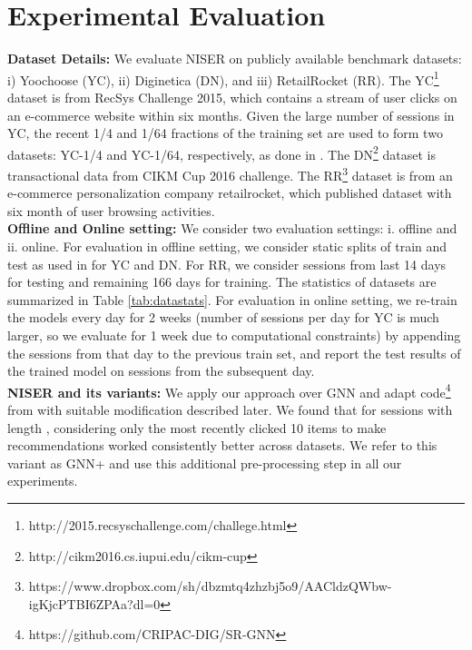 \documentclass[sigconf]{acmart}
\begin{document}
\section{Experimental Evaluation}
\textbf{Dataset Details:}
We evaluate NISER on publicly available benchmark datasets: i) Yoochoose (YC), ii) Diginetica (DN), and iii) RetailRocket (RR).
The YC\footnote{http://2015.recsyschallenge.com/challege.html} dataset is from RecSys Challenge 2015, which contains a stream of user clicks on an e-commerce website within six months. 
Given the large number of sessions in YC, the recent 1/4 and 1/64 fractions of the training set are used to form two datasets: YC-1/4 and YC-1/64, respectively, as done in \cite{wu2018session}.
The DN\footnote{http://cikm2016.cs.iupui.edu/cikm-cup} dataset is transactional data from CIKM Cup 2016 challenge. The RR\footnote{https://www.dropbox.com/sh/dbzmtq4zhzbj5o9/AACldzQWbw-igKjcPTBI6ZPAa?dl=0} dataset is from an e-commerce personalization company retailrocket, which published dataset with six month of user browsing activities.
\\
\textbf{Offline and Online setting:} 
We consider two evaluation settings: i. offline and ii. online.
For evaluation in offline setting, we consider static splits of train and test as used in \cite{wu2018session} for YC and DN.
For RR, we consider sessions from last 14 days for testing and remaining 166 days for training. 
The statistics of datasets are summarized in Table \ref{tab:datastats}.
For evaluation in online setting, we re-train the models every day for 2 weeks (number of sessions per day for YC is much larger, so we evaluate for 1 week due to computational constraints) by appending the sessions from that day to the previous train set, and report the test results of the trained model on sessions from the subsequent day.\\
\textbf{NISER and its variants:}
We apply our approach over GNN and adapt code\footnote{https://github.com/CRIPAC-DIG/SR-GNN} from \cite{wu2018session} with suitable modification described later.
We found that for sessions with length , considering only the most recently clicked 10 items to make recommendations worked consistently better across datasets. 
We refer to this variant as GNN+ and use this additional pre-processing step in all our experiments.
\begin{table}[t]
	\caption{Statistics of the datasets used for offline experiments. \label{tab:datastats}}
	\vspace{-2mm}
		\vspace{-4mm}
	\end{table}
\end{document}
